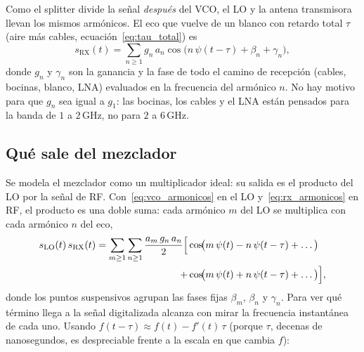 \documentclass[12pt, a4paper, twoside]{report}
\begin{document}
Como el splitter divide la señal \emph{después} del VCO, el LO y la antena
transmisora llevan los mismos armónicos. El eco que vuelve de un blanco
con retardo total $\tau$ (aire más cables, ecuación~\eqref{eq:tau_total}) es
\begin{equation}
  s_\text{RX}(t) = \sum_{n\geq 1} g_n\,a_n
    \cos\!\bigl(n\,\psi(t-\tau) + \beta_n + \gamma_n\bigr),
  \label{eq:rx_armonicos}
\end{equation}
donde $g_n$ y $\gamma_n$ son la ganancia y la fase de todo el camino de
recepción (cables, bocinas, blanco, LNA) evaluados en la frecuencia del
armónico $n$. No hay motivo para que $g_n$ sea igual a $g_1$: las bocinas,
los cables y el LNA están pensados para la banda de $1$ a $2\,\text{GHz}$, no
para $2$ a $6\,\text{GHz}$.

\subsection{Qué sale del mezclador}
\label{sub:armonicos_mezclador}

Se modela el mezclador como un multiplicador ideal: su salida es el producto
del LO por la señal de RF. Con~\eqref{eq:vco_armonicos} en el LO
y~\eqref{eq:rx_armonicos} en RF, el producto es una doble suma: cada
armónico $m$ del LO se multiplica con cada armónico $n$ del eco,
\begin{equation}
  \begin{split}
  s_\text{LO}(t)\,s_\text{RX}(t) = \sum_{m\geq 1}\sum_{n\geq 1}
  \frac{a_m\,g_n\,a_n}{2}\Bigl[
    &\cos\!\bigl(m\,\psi(t) - n\,\psi(t-\tau) + \dots\bigr) \\
  + &\cos\!\bigl(m\,\psi(t) + n\,\psi(t-\tau) + \dots\bigr)
  \Bigr],
  \end{split}
  \label{eq:producto_armonicos}
\end{equation}
donde los puntos suspensivos agrupan las fases fijas $\beta_m$, $\beta_n$ y
$\gamma_n$. Para ver qué término llega a la señal digitalizada alcanza con
mirar la frecuencia instantánea de cada uno. Usando
$f(t-\tau) \approx f(t) - f'(t)\,\tau$ (porque $\tau$, decenas de
nanosegundos, es despreciable frente a la escala en que cambia $f$):
\end{document}
